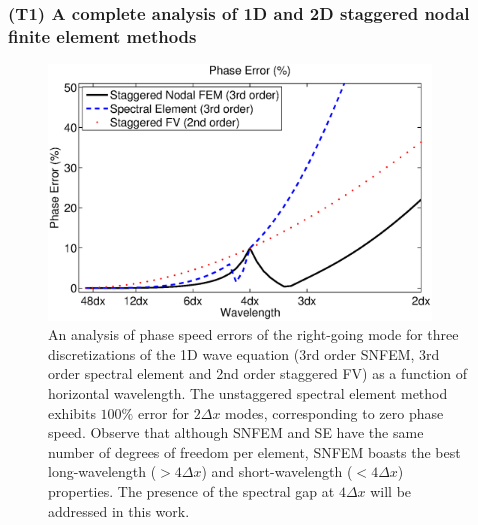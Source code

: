 \documentclass[11pt]{article}
\begin{document}
\subsubsection{(T1) A complete analysis of 1D and 2D staggered nodal finite element methods} \label{sec:AnalysisSNFEM}

\begin{figure}
\begin{center}
\includegraphics[width=4in]{PhaseErrors}
\end{center}
\caption{An analysis of phase speed errors of the right-going mode for three discretizations of the 1D wave equation (3rd order SNFEM, 3rd order spectral element and 2nd order staggered FV) as a function of horizontal wavelength.  The unstaggered spectral element method exhibits $100\%$ error for $2 \Delta x$ modes, corresponding to zero phase speed.  Observe that although SNFEM and SE have the same number of degrees of freedom per element, SNFEM boasts the best long-wavelength ($> 4 \Delta x$) and short-wavelength ($< 4 \Delta x$) properties.  The presence of the spectral gap at $4 \Delta x$ will be addressed in this work.} \label{fig:SNFEMEigenstructure}
\end{figure}
\end{document}

